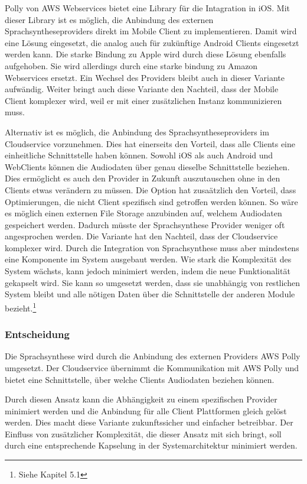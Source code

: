 Polly von AWS Webservices bietet eine Library für die Intagration in iOS. \cite{aws_polly_ios}
Mit dieser Library ist es möglich, die Anbindung des externen Sprachsyntheseproviders direkt im Mobile Client zu implementieren.
Damit wird eine Lösung eingesetzt, die analog auch für zukünftige Android Clients eingesetzt werden kann.
Die starke Bindung zu Apple wird durch diese Lösung ebenfalls aufgehoben.
Sie wird allerdings durch eine starke bindung zu Amazon Webservices ersetzt.
Ein Wechsel des Providers bleibt auch in dieser Variante aufwändig.
Weiter bringt auch diese Variante den Nachteil, dass der Mobile Client komplexer wird, weil er mit einer zusätzlichen Instanz kommunizieren muss.

\clearpage

Alternativ ist es möglich, die Anbindung des Sprachsyntheseproviders im Cloudservice vorzunehmen.
Dies hat einerseits den Vorteil, dass alle Clients eine einheitliche Schnittstelle haben können.
Sowohl iOS als auch Android und WebClients können die Audiodaten über genau dieselbe Schnittstelle beziehen.
Dies ermöglicht es auch den Provider in Zukunft auszutauschen ohne in den Clients etwas verändern zu müssen.
Die Option hat zusaätzlich den Vorteil, dass Optimierungen, die nicht Client spezifisch sind getroffen werden können.
So wäre es möglich einen externen File Storage anzubinden auf, welchem Audiodaten gespeichert werden.
Dadurch müsste der Sprachsynthese Provider weniger oft angesprochen werden.
Die Variante hat den Nachteil, dass der Cloudservice komplexer wird.
Durch die Integration von Sprachsynthese muss aber mindestens eine Komponente im System ausgebaut werden.
Wie stark die Komplexität des System wächsts, kann jedoch minimiert werden, indem die neue Funktionalität gekapselt wird.
Sie kann so umgesetzt werden, dass sie unabhängig von restlichen System bleibt und alle nötigen Daten über die Schnittstelle der anderen Module bezieht.\footnote{Siehe Kapitel 5.1}

\subsubsection*{Entscheidung}

Die Sprachsynthese wird durch die Anbindung des externen Providers AWS Polly umgesetzt.
Der Cloudservice übernimmt die Kommunikation mit AWS Polly und bietet eine Schnittstelle, über welche Clients Audiodaten beziehen können.

Durch diesen Ansatz kann die Abhängigkeit zu einem spezifischen Provider minimiert werden und die Anbindung für alle Client Plattformen gleich gelöst werden.
Dies macht diese Variante zukunftssicher und einfacher betreibbar.
Der Einfluss von zusätzlicher Komplexität, die dieser Ansatz mit sich bringt, soll durch eine entsprechende Kapselung in der Systemarchitektur minimiert werden.

\clearpage

